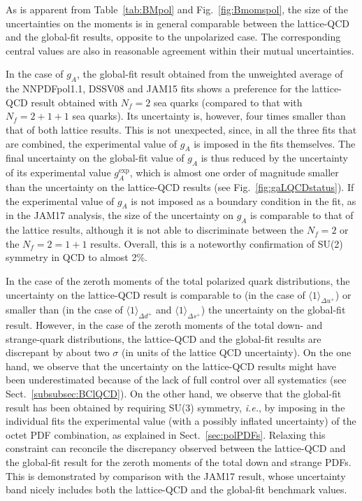 As is apparent from Table~\ref{tab:BMpol} and Fig.~\ref{fig:Bmomspol}, the 
size of the uncertainties on the moments is in general comparable between the 
lattice-QCD and the global-fit results, opposite to the unpolarized case.
%
The corresponding central values are also in reasonable agreement within their
mutual uncertainties.

In the case of $g_A$, the global-fit result obtained from the unweighted 
average of the NNPDFpol1.1, DSSV08 and JAM15 fits shows a preference for the
lattice-QCD result obtained with $N_f=2$ sea quarks (compared to that with 
$N_f=2+1+1$ sea quarks).
%
Its uncertainty is, however, four times smaller than that of both lattice 
results.
%
This is not unexpected, since, in all the three fits that are combined, the 
experimental value of $g_A$ is imposed in the fits themselves.
%
The final uncertainty on the global-fit value of $g_A$ is thus reduced by 
the uncertainty of its experimental value $g_A^\text{exp}$, which is almost
one order of magnitude smaller than the uncertainty on the lattice-QCD results
(see Fig.~\ref{fig:gaLQCDstatus}).
%
If the experimental value of $g_A$ is not imposed as a boundary condition in 
the fit, as in the JAM17 analysis, the size of the uncertainty on $g_A$ is 
comparable to that of the lattice results, although it is not able to 
discriminate between the $N_f=2$ or the $N_f=2=1+1$ results.
%
Overall, this is a noteworthy confirmation of SU(2) symmetry in QCD to
almost 2\%.

In the case of the zeroth moments of the total polarized quark distributions,
the uncertainty on the lattice-QCD result is comparable to (in the case
of $\langle 1 \rangle_{\Delta u^+}$) or smaller than (in the case
of $\langle 1 \rangle_{\Delta d^+}$ and $\langle 1 \rangle_{\Delta s^+}$)
the uncertainty on the global-fit result.
%
However, in the case of the zeroth moments of the total down- and strange-quark 
distributions, the lattice-QCD and the global-fit results are discrepant
by about two $\sigma$ (in units of the
lattice QCD uncertainty).
%
On the one hand, we observe that the uncertainty on the lattice-QCD results 
might have been underestimated because of the lack of full control over
all systematics (see Sect.~\ref{subsubsec:BClQCD}).
%
On the other hand, we observe that the global-fit result has been obtained
by requiring SU(3) symmetry, {\it i.e.}, by imposing in the individual fits 
the experimental value (with a possibly inflated uncertainty) of the octet PDF 
combination, as explained in Sect.~\ref{sec:polPDFs}.
%
Relaxing this constraint can reconcile the discrepancy observed between 
the lattice-QCD and the global-fit result for the zeroth moments of the 
total down and strange PDFs.
%
This is demonstrated by comparison with the JAM17 result, whose uncertainty 
band nicely includes both the lattice-QCD and the global-fit benchmark values.

